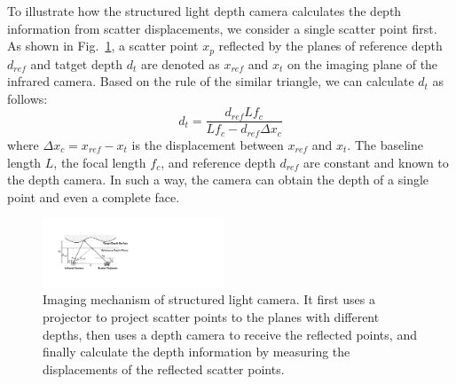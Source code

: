To illustrate how the structured light depth camera calculates the depth information from scatter displacements, we consider a single scatter point first.
As shown in Fig.~\ref{imaging_mechanism}, a scatter point $x_p$ reflected by the planes of  reference depth $d_{ref}$ and tatget depth $d_t$ are denoted as $x_{ref}$ and $x_{t}$ on the imaging plane of the infrared camera.
Based on the rule of the similar triangle, we can calculate $d_t$ as follows:
\begin{equation}
	d_t= \frac{d_{ref}Lf_c}{Lf_c - d_{ref}\Delta x_c}
	\label{d_cal}
\end{equation}
where $\Delta x_c=x_{ref}-x_{t}$ is the displacement between $x_{ref}$ and $x_{t}$. The baseline length $L$, the focal length $f_c$, and reference depth $d_{ref}$ are constant and known to the depth camera. In such a way, the camera can obtain the depth of a single point and even a complete face.

%


\begin{figure}[!t]
	\centering
	\includegraphics[width=0.48\textwidth]{figures/imaging_mechanism.pdf} 
	\vspace{-0.1in}
	\caption{Imaging mechanism of structured light camera. It first uses a projector to project scatter points to the planes with different depths, then uses a depth camera to receive the reflected points, and finally calculate the depth information by measuring the displacements of the reflected scatter points.}
	\label{imaging_mechanism}
	\vspace{-0.15in}
\end{figure}

